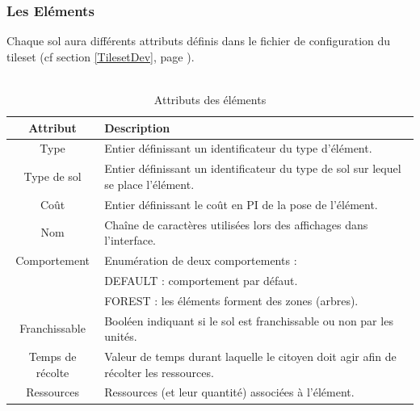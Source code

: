 \documentclass[a4paper]{memoir}
\begin{document}
				\subsubsection{Les Eléments}
					Chaque sol aura différents attributs définis dans le fichier de configuration du tileset (cf section \ref{TilesetDev}, page \pageref{TilesetDev}).\\
					\\
					\begin{table}[H]
						\begin{small}
							\begin{tabular}{| c | l |}
								\hline
								\textbf{Attribut} & \textbf{Description}\\
								\hline
								Type & Entier définissant un identificateur du type d'élément.\\
								\hline
								Type de sol & Entier définissant un identificateur du type de sol sur lequel se place l'élément.\\
								\hline
								Coût & Entier définissant le coût en PI de la pose de l'élément.\\
								\hline
								Nom & Chaîne de caractères utilisées lors des affichages dans l'interface.\\
								\hline
								Comportement & Enumération de deux comportements :\\
								& DEFAULT : comportement par défaut.\\
								& FOREST : les éléments forment des zones (arbres).\\
								\hline
								Franchissable & Booléen indiquant si le sol est franchissable ou non par les unités.\\
								\hline
								Temps de récolte & Valeur de temps durant laquelle le citoyen doit agir afin de récolter les ressources.\\
								\hline
								Ressources & Ressources (et leur quantité) associées à l'élément.\\
								\hline
							\end{tabular}
						\end{small}
						\label{tab:element}
						\caption{Attributs des éléments}
					\end{table}
					
					
\end{document}
